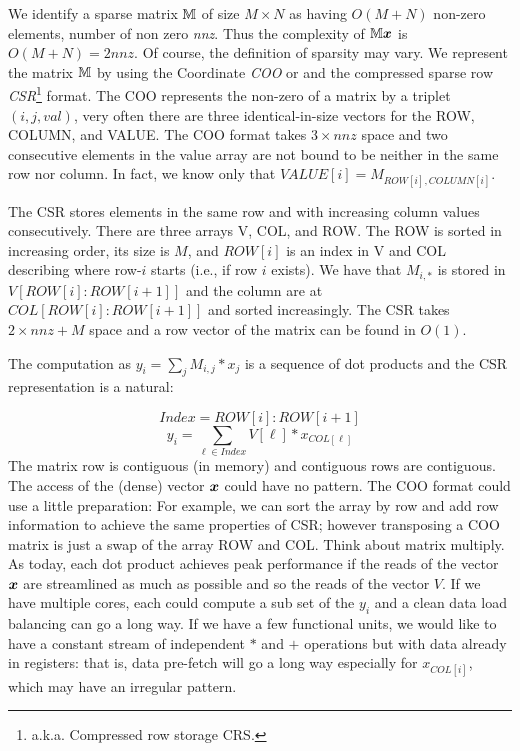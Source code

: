 \documentclass[manuscript,screen]{acmart}
\begin{document}
We identify a sparse matrix $\mathbb{M}$ of size $M\times N$ as having
$O(M+N)$ non-zero elements, number of non zero {\em nnz}. Thus the
complexity of $\mathbb{M} {\boldsymbol x}$ is $O(M+N) = 2nnz$. Of course, the
definition of sparsity may vary. We represent the matrix $\mathbb{M}$ by using
the Coordinate {\em COO} or and the compressed sparse row {\em
  CSR}\footnote{a.k.a. Compressed row storage {\rm CRS}.}  format. The
COO represents the non-zero of a matrix by a triplet $(i,j,val)$, very
often there are three identical-in-size vectors for the ROW, COLUMN,
and VALUE. The COO format takes $3\times nnz$ space and two
consecutive elements in the value array are not bound to be neither in
the same row nor column. In fact, we know only that $VALUE[i] =
M_{ROW[i],COLUMN[i]}$.

The CSR stores elements in the same row and with increasing column
values consecutively. There are three arrays V, COL, and ROW. The ROW
is sorted in increasing order, its size is $M$, and $ROW[i]$ is an
index in V and COL describing where row-$i$ starts (i.e., if row $i$
exists).  We have that $M_{i,*}$ is stored in $V[ROW[i]:ROW[i+1]]$ and
the column are at $COL[ROW[i]:ROW[i+1]]$ and sorted increasingly. The
CSR takes $2\times nnz + M$ space and a row vector of the matrix can
be found in $O(1)$.
 
The computation as $y_i = \sum_j M_{i,j}*x_j$ is a sequence of dot
products and the CSR representation is a natural:

\[ Index = ROW[i]:ROW[i+1] \]
\[
y_i =  \sum_{\ell\in Index} V[\ell] * x_{COL[\ell]}  
\]
The matrix row is contiguous (in memory) and contiguous rows are
contiguous. The access of the (dense) vector ${\boldsymbol x}$ could have no
pattern. The COO format could use a little preparation: For example,
we can sort the array by row and add row information to achieve the
same properties of CSR; however transposing a COO matrix is just a
swap of the array ROW and COL. Think about matrix multiply. As today,
each dot product achieves peak performance if the reads of the vector
${\boldsymbol x}$ are streamlined as much as possible and so the reads of the
vector $V$. If we have multiple cores, each could compute a sub set of
the $y_i$ and a clean data load balancing can go a long way. If we
have a few functional units, we would like to have a constant stream
of independent $*$ and $+$ operations but with data already in
registers: that is, data pre-fetch will go a long way especially for
$x_{COL[i]}$, which may have an irregular pattern.
\end{document}
